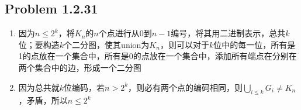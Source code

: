 \subsection*{Problem 1.2.31}
\begin{enumerate}
	\item	因为$n \leq 2^k$，将$K_n$的$n$个点进行从0到$n - 1$编号，将其用二进制表示，总共$k$位；要构造$k$个二分图，使其union为$K_n$，则可以对于$k$位中的每一位，所有是1的点放在一个集合中，所有是0的点放在一个集合中，添加所有端点在分别在两个集合中的边，形成一个二分图
	\item	因为总共就$k$位编码，若$n > 2^k$，则必有两个点的编码相同，则$\bigcup_{i \leq k} G_i \neq K_n$，矛盾，所以$n \leq 2^k$
\end{enumerate}

